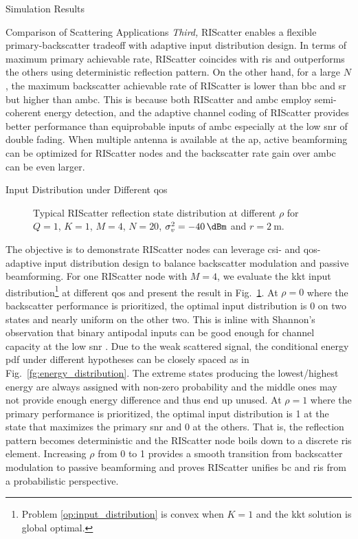 \documentclass[journal]{IEEEtran}
\begin{document}
\begin{section}{Simulation Results}
\begin{subsection}{Comparison of Scattering Applications}
		\emph{Third,} RIScatter enables a flexible primary-backscatter tradeoff with adaptive input distribution design.
		In terms of maximum primary achievable rate, RIScatter coincides with \gls{ris} and outperforms the others using deterministic reflection pattern.
		On the other hand, for a large $N$, the maximum backscatter achievable rate of RIScatter is lower than \gls{bbc} and \gls{sr} but higher than \gls{ambc}.
		This is because both RIScatter and \gls{ambc} employ semi-coherent energy detection, and the adaptive channel coding of RIScatter provides better performance than equiprobable inputs of \gls{ambc} especially at the low \gls{snr} of double fading.
		When multiple antenna is available at the \gls{ap}, active beamforming can be optimized for RIScatter nodes and the backscatter rate gain over \gls{ambc} can be even larger.
	\end{subsection}

	\begin{subsection}{Input Distribution under Different \gls{qos}}
		\begin{figure}[!t]
			\centering
			\resizebox{0.65\columnwidth}{!}{
				
			}
			\caption{Typical RIScatter reflection state distribution at different $\rho$ for $Q=1$, $K=1$, $M=4$, $N=20$, $\sigma_v^2=\SI{-40}{\dBm}$ and $r=\SI{2}{\meter}$.}
			\label{fg:distribution_weights}
		\end{figure}
		The objective is to demonstrate RIScatter nodes can leverage \gls{csi}- and \gls{qos}-adaptive input distribution design to balance backscatter modulation and passive beamforming.
		For one RIScatter node with $M=4$, we evaluate the \gls{kkt} input distribution\footnote{Problem \eqref{op:input_distribution} is convex when $K=1$ and the \gls{kkt} solution is global optimal.} at different \gls{qos} and present the result in Fig.~\ref{fg:distribution_weights}.
		At $\rho=0$ where the backscatter performance is prioritized, the optimal input distribution is \num{0} on two states and nearly uniform on the other two.
		This is inline with Shannon's observation that binary antipodal inputs can be good enough for channel capacity at the low \gls{snr} \cite{Shannon1948}.
		Due to the weak scattered signal, the conditional energy \gls{pdf} under different hypotheses can be closely spaced as in Fig.~\ref{fg:energy_distribution}.
		The extreme states producing the lowest/highest energy are always assigned with non-zero probability and the middle ones may not provide enough energy difference and thus end up unused.
		At $\rho=1$ where the primary performance is prioritized, the optimal input distribution is \num{1} at the state that maximizes the primary \gls{snr} and \num{0} at the others.
		That is, the reflection pattern becomes deterministic and the RIScatter node boils down to a discrete \gls{ris} element.
		Increasing $\rho$ from \num{0} to \num{1} provides a smooth transition from backscatter modulation to passive beamforming and proves RIScatter unifies \gls{bc} and \gls{ris} from a probabilistic perspective.
	\end{subsection}


\end{section}
\end{document}
